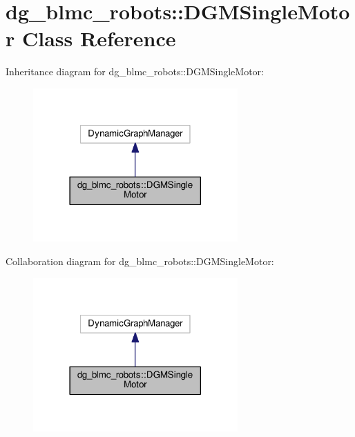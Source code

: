 \hypertarget{classdg__blmc__robots_1_1DGMSingleMotor}{}\section{dg\+\_\+blmc\+\_\+robots\+:\+:D\+G\+M\+Single\+Motor Class Reference}
\label{classdg__blmc__robots_1_1DGMSingleMotor}


Inheritance diagram for dg\+\_\+blmc\+\_\+robots\+:\+:D\+G\+M\+Single\+Motor\+:
\nopagebreak
\begin{figure}[H]
\begin{center}
\leavevmode
\includegraphics[width=222pt]{classdg__blmc__robots_1_1DGMSingleMotor__inherit__graph}
\end{center}
\end{figure}


Collaboration diagram for dg\+\_\+blmc\+\_\+robots\+:\+:D\+G\+M\+Single\+Motor\+:
\nopagebreak
\begin{figure}[H]
\begin{center}
\leavevmode
\includegraphics[width=222pt]{classdg__blmc__robots_1_1DGMSingleMotor__coll__graph}
\end{center}
\end{figure}

